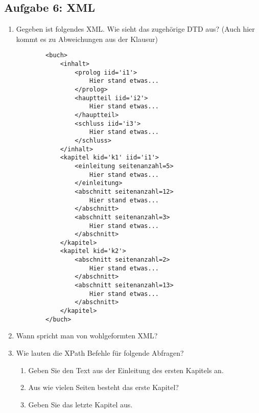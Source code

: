 \newpage
\subsection{Aufgabe 6: XML}
\label{sec:Aufgabe6}
\begin{enumerate}[label=\alph*)]
    \item Gegeben ist folgendes XML. Wie sieht das zugehörige DTD aus? (Auch hier kommt es zu Abweichungen aus der Klausur)
    \begin{verbatim}
        <buch>
            <inhalt>
                <prolog iid='i1'>
                    Hier stand etwas...
                </prolog>
                <hauptteil iid='i2'>
                    Hier stand etwas...
                </hauptteil>
                <schluss iid='i3'>
                    Hier stand etwas...
                </schluss>
            </inhalt>
            <kapitel kid='k1' iid='i1'>
                <einleitung seitenanzahl=5>
                    Hier stand etwas...
                </einleitung>
                <abschnitt seitenanzahl=12>
                    Hier stand etwas...
                </abschnitt>
                <abschnitt seitenanzahl=3>
                    Hier stand etwas...
                </abschnitt>
            </kapitel>
            <kapitel kid='k2'>
                <abschnitt seitenanzahl=2>
                    Hier stand etwas...
                </abschnitt>
                <abschnitt seitenanzahl=13>
                    Hier stand etwas...
                </abschnitt>
            </kapitel>
        </buch>
    \end{verbatim}
    
    \item Wann spricht man von wohlgeformten XML?
    \item Wie lauten die XPath Befehle für folgende Abfragen?
    \begin{enumerate}[label=\arabic*.]
        \item Geben Sie den Text aus der Einleitung des ersten Kapitels an.
        \item Aus wie vielen Seiten besteht das erste Kapitel?
        \item Geben Sie das letzte Kapitel aus.
    \end{enumerate}
\end{enumerate}
